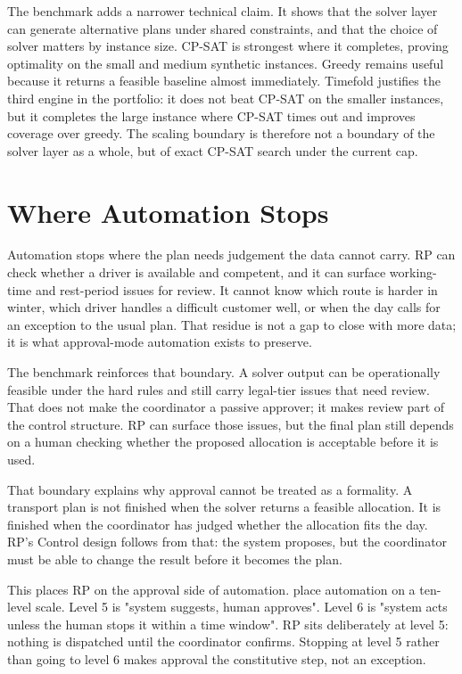 The benchmark adds a narrower technical claim. It shows that the solver layer can generate alternative plans under shared constraints, and that the choice of solver matters by instance size. CP-SAT is strongest where it completes, proving optimality on the small and medium synthetic instances. Greedy remains useful because it returns a feasible baseline almost immediately. Timefold justifies the third engine in the portfolio: it does not beat CP-SAT on the smaller instances, but it completes the large instance where CP-SAT times out and improves coverage over greedy. The scaling boundary is therefore not a boundary of the solver layer as a whole, but of exact CP-SAT search under the current cap.


\section{Where Automation Stops}
\label{sec:trust-control}

Automation stops where the plan needs judgement the data cannot carry. RP can check whether a driver is available and competent, and it can surface working-time and rest-period issues for review. It cannot know which route is harder in winter, which driver handles a difficult customer well, or when the day calls for an exception to the usual plan. That residue is not a gap to close with more data; it is what approval-mode automation exists to preserve.

The benchmark reinforces that boundary. A solver output can be operationally feasible under the hard rules and still carry legal-tier issues that need review. That does not make the coordinator a passive approver; it makes review part of the control structure. RP can surface those issues, but the final plan still depends on a human checking whether the proposed allocation is acceptable before it is used.

That boundary explains why approval cannot be treated as a formality. A transport plan is not finished when the solver returns a feasible allocation. It is finished when the coordinator has judged whether the allocation fits the day. RP's Control design follows from that: the system proposes, but the coordinator must be able to change the result before it becomes the plan.

This places RP on the approval side of automation. \textcite{parasuraman2000automation} place automation on a ten-level scale. Level 5 is "system suggests, human approves". Level 6 is "system acts unless the human stops it within a time window". RP sits deliberately at level 5: nothing is dispatched until the coordinator confirms. Stopping at level 5 rather than going to level 6 makes approval the constitutive step, not an exception.

